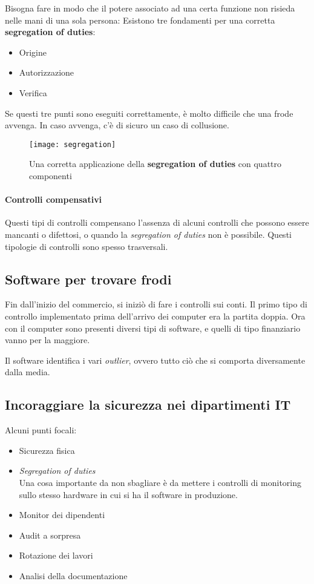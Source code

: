 Bisogna fare in modo che il potere associato ad una certa funzione non risieda
nelle mani di una sola persona:
Esistono tre fondamenti per una corretta \textbf{segregation of duties}:
\begin{itemize}
  \item Origine
  \item Autorizzazione
  \item Verifica
\end{itemize}

Se questi tre punti sono eseguiti correttamente, è molto difficile che una
frode avvenga. In caso avvenga, c'è di sicuro un caso di collusione.

\begin{figure}[H]
 \centering
 \texttt{[image: segregation]}
 \caption{Una corretta applicazione della \textbf{segregation of duties} con 
quattro componenti}
\end{figure}


\paragraph*{Controlli compensativi}

Questi tipi di controlli compensano l'assenza di alcuni controlli che possono
essere mancanti o difettosi, o quando la \textit{segregation of duties} non è
possibile. Questi tipologie di controlli sono spesso trasversali.

\subsection{Software per trovare frodi}

Fin dall'inizio del commercio, si iniziò di fare i controlli sui conti. Il
primo tipo di controllo implementato prima dell'arrivo dei computer era la
partita doppia. Ora con il computer sono presenti diversi tipi di software, e
quelli di tipo finanziario vanno per la maggiore.

Il software identifica i vari \textit{outlier}, ovvero tutto ciò che si
comporta diversamente dalla media.

\subsection{Incoraggiare la sicurezza nei dipartimenti IT}

Alcuni punti focali:
\begin{itemize}
  \item Sicurezza fisica
  \item \textit{Segregation of duties} \\
  Una cosa importante da non sbagliare è da mettere i controlli di monitoring
  sullo stesso hardware in cui si ha il software in produzione.
  \item Monitor dei dipendenti
  \item Audit a sorpresa
  \item Rotazione dei lavori
  \item Analisi della documentazione
\end{itemize}


